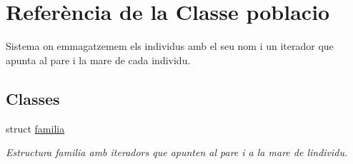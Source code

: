 \hypertarget{classpoblacio}{}\section{Referència de la Classe poblacio}
\label{classpoblacio}


Sistema on emmagatzemem els individus amb el seu nom i un iterador que apunta al pare i la mare de cada individu.  


\subsection*{Classes}
\begin{DoxyCompactItemize}
\item 
struct \hyperlink{structpoblacio_1_1familia}{familia}
\begin{DoxyCompactList}\small\item\em Estructura familia amb iteradors que apunten al pare i a la mare de l\textquotesingle{}individu. \end{DoxyCompactList}\end{DoxyCompactItemize}
